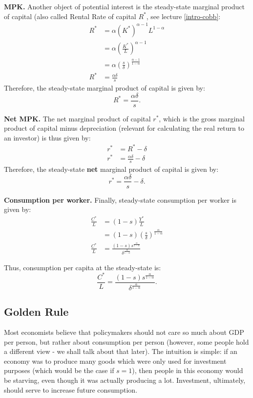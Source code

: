 \documentclass[]{book}
\theoremstyle{definition}
\theoremstyle{definition}
\theoremstyle{definition}
\theoremstyle{remark}
\begin{document}
\textbf{MPK.} Another object of potential interest is the steady-state
marginal product of capital (also called Rental Rate of capital
\(R^{*}\), see lecture \ref{intro-cobb}: \[
\begin{aligned}
R^{*}&=\alpha \left(K^{*}\right)^{\alpha-1} L^{1-\alpha}\\
&=\alpha\left(\frac{K^{*}}{L}\right)^{\alpha-1}\\
&=\alpha\left(\frac{s}{\delta}\right)^{\frac{\alpha-1}{1-\alpha}}\\
R^{*}&=\frac{\alpha \delta}{s}
\end{aligned}
\] Therefore, the steady-state marginal product of capital is given by:
\[\boxed{R^{*}=\frac{\alpha \delta}{s}}.\]

\textbf{Net MPK.} The net marginal product of capital \(r^{*}\), which
is the gross marginal product of capital minus depreciation (relevant
for calculating the real return to an investor) is thus given by: \[
\begin{aligned}
r^{*}&=R^{*}-\delta\\
r^{*}&=\frac{\alpha \delta}{s}-\delta
\end{aligned}
\] Therefore, the steady-state \textbf{net} marginal product of capital
is given by: \[\boxed{r^{*}=\frac{\alpha \delta}{s}-\delta}.\]

\textbf{Consumption per worker.} Finally, steady-state consumption per
worker is given by: \[
\begin{aligned}
\frac{C^{*}}{L}&=(1-s)\frac{Y^{*}}{L}\\
&=(1-s)\left(\frac{s}{\delta}\right)^{\frac{\alpha}{1-\alpha}}\\
\frac{C^{*}}{L}&=\frac{(1-s)s^{\frac{\alpha}{1-\alpha}}}{\delta^{\frac{\alpha}{1-\alpha}}}
\end{aligned}
\]

Thus, consumption per capita at the steady-state is:
\[\boxed{\frac{C^{*}}{L}=\frac{(1-s)s^{\frac{\alpha}{1-\alpha}}}{\delta^{\frac{\alpha}{1-\alpha}}}}.\]

\subsection{Golden Rule}\label{golden-rule}

Most economists believe that policymakers should not care so much about
GDP per person, but rather about consumption per person (however, some
people hold a different view - we shall talk about that later). The
intuition is simple: if an economy was to produce many goods which were
only used for investment purposes (which would be the case if
\(s = 1\)), then people in this economy would be starving, even though
it was actually producing a lot. Investment, ultimately, should serve to
increase future consumption.
\end{document}
